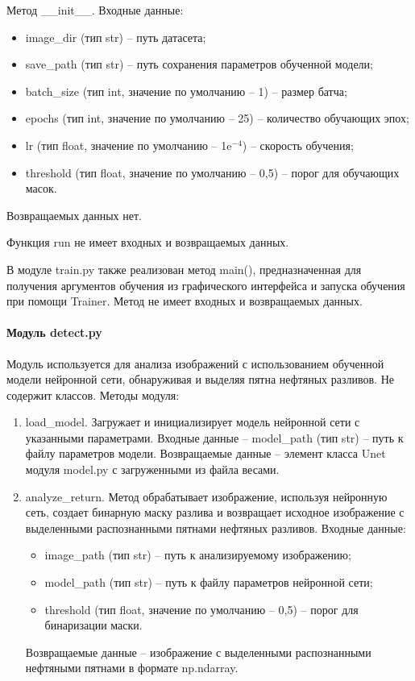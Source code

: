 Метод \_\_init\_\_. Входные данные:
\begin{itemize}
	\item image\_dir (тип str) -- путь датасета;
	\item save\_path (тип str) -- путь сохранения параметров обученной модели;
	\item batch\_size (тип int, значение по умолчанию -- 1) -- размер батча;
	\item epochs (тип int, значение по умолчанию -- 25) -- количество обучающих эпох;
	\item lr (тип float, значение по умолчанию --  1e$^{-4} $) -- скорость обучения;
	\item threshold (тип float, значение по умолчанию -- 0,5) -- порог для обучающих масок.
\end{itemize}
Возвращаемых данных нет. 

Функция run не имеет входных и возвращаемых данных.

В модуле train.py также реализован метод main(), предназначенная для получения аргументов обучения из графического интерфейса и запуска обучения при помощи Trainer. Метод не имеет входных и возвращаемых данных.

\paragraph{Модуль detect.py}

Модуль используется для анализа изображений с использованием обученной модели нейронной сети, обнаруживая и выделяя пятна нефтяных разливов.  Не содержит классов. Методы модуля:
\begin{enumerate}
	\item load\_model. Загружает и инициализирует модель нейронной сети с указанными параметрами. Входные данные -- model\_path (тип str) -- путь к файлу параметров модели. Возвращаемые данные -- элемент класса Unet модуля model.py с загруженными из файла весами.
	\item analyze\_return. Метод обрабатывает изображение, используя нейронную сеть, создает бинарную маску разлива и возвращает исходное изображение с выделенными распознанными пятнами нефтяных разливов. Входные данные:
	\begin{itemize}
		\item image\_path (тип str) -- путь к анализируемому изображению;
		\item model\_path (тип str) -- путь к файлу параметров нейронной сети;
		\item threshold (тип float, значение по умолчанию -- 0,5) -- порог для бинаризации маски.
	\end{itemize}
	Возвращаемые данные -- изображение с выделенными распознанными нефтяными пятнами в формате np.ndarray.
\end{enumerate}

